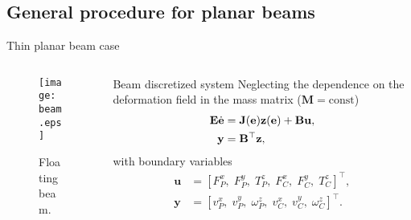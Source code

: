 \documentclass[aspectratio=169]{ISAE-Beamer}
\begin{document}
\subsection{General procedure for planar beams}
\begin{frame}{Thin planar beam case}
	\begin{columns}[T]
		\begin{column}{0.5\columnwidth}
				\begin{tcolorbox}
				\begin{figure}
					\centering
					\texttt{[image: beam.eps]} 
					\caption{Floating beam.}
					\label{fig:beam}
				\end{figure}
			\end{tcolorbox}
		\end{column}
		\begin{column}{0.5\textwidth}
		\begin{block}{Beam discretized system}
			Neglecting the dependence on the deformation field in the mass matrix ($\mathbf{M}=\text{const}$)
			\begin{equation*}
			\begin{aligned}
			\mathbf{E} \dot{\mathbf{e}} &= \mathbf{J}(\mathbf{e}) \mathbf{z}(\mathbf{e}) + \mathbf{B} \mathbf{u}, \vspace{2mm} \\
			\mathbf{y} &= \mathbf{B}^{\top}  \mathbf{z}, \\
			\end{aligned}
			\end{equation*}
			with boundary variables
			\begin{equation*}
			\begin{aligned}
			\mathbf{u} &=  [F_{P}^x, \; F_{P}^y, \; T_{P}^z, \; F_{C}^x, \; F_{C}^y, \; T_{C}^z]^\top, \\
			\mathbf{y} &=  [v_{P}^x, \; v_{P}^y, \; \omega_{P}^z, \; v_{C}^x, \; v_{C}^y, \; \omega_{C}^z]^\top.
			\end{aligned}
			\end{equation*}
		\end{block}	
		\end{column}
	\end{columns}

\end{frame}
\end{document}
